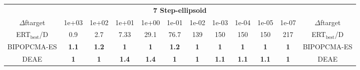 \begin{tabular}{cccccccccccc}
 & \multicolumn{10}{c}{{\normalsize \textbf{7 Step-ellipsoid}}}\\
$\Delta$ftarget& 1e+03& 1e+02& 1e+01& 1e+00& 1e-01& 1e-02& 1e-03& 1e-04& 1e-05& 1e-07 & $\Delta$ftarget \\
ERT$_{\textrm{best}}$/D& 0.9& 2.7& 7.33& 29.1& 76.7& 139& 150& 150& 150& 217 & ERT$_{\textrm{best}}$/D \\
\hline
BIPOPCMA-ES & \textbf{1.1} & \textbf{1.2} & \textbf{1} & \textbf{1} & \textbf{1.2} & \textbf{1} & \textbf{1} & \textbf{1} & \textbf{1} & \textbf{1} & BIPOPCMA-ES \cite{add_an_entry_for_BIPOPCMA-ES_in_bbob.bib}\\
DEAE & \textbf{1} & \textbf{1} & \textbf{1.4} & \textbf{1.4} & \textbf{1} & \textbf{1} & \textbf{1.1} & \textbf{1.1} & \textbf{1.1} & \textbf{1} & DEAE \cite{add_an_entry_for_DEAE_in_bbob.bib}
\end{tabular}
